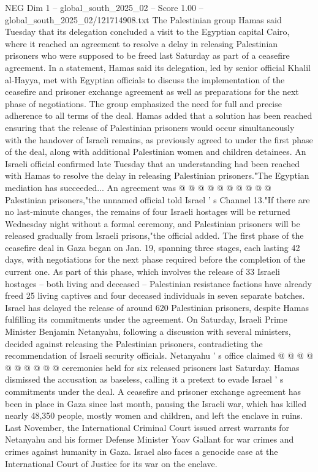 \begin{textsample}{NEG Dim 1 – global\_south\_2025\_02 – Score 1.00 – global\_south\_2025\_02/121714908.txt}  \label{ex:f1_neg_035}
The Palestinian group Hamas said Tuesday that its delegation concluded a visit to the Egyptian capital Cairo, where it reached an agreement to resolve a delay in releasing Palestinian prisoners who were supposed to be freed last Saturday as part of a ceasefire agreement.
In a statement, Hamas said its delegation, led by senior official Khalil al-Hayya, met with Egyptian officials to discuss the implementation of the ceasefire and prisoner exchange agreement as well as preparations for the next phase of negotiations.
The group emphasized the need for full and precise adherence to all terms of the deal.
Hamas added that a solution has been reached ensuring that the release of Palestinian prisoners would occur simultaneously with the handover of Israeli remains, as previously agreed to under the first phase of the deal, along with additional Palestinian women and children detainees.
An Israeli official confirmed late Tuesday that an understanding had been reached with Hamas to resolve the delay in releasing Palestinian prisoners."The Egyptian mediation has succeeded...
An agreement was @ @ @ @ @ @ @ @ @ @ Palestinian prisoners,"the unnamed official told Israel ' s Channel 13."If there are no last-minute changes, the remains of four Israeli hostages will be returned Wednesday night without a formal ceremony, and Palestinian prisoners will be released gradually from Israeli prisons,"the official added.
The first phase of the ceasefire deal in Gaza began on Jan. 19, spanning three stages, each lasting 42 days, with negotiations for the next phase required before the completion of the current one.
As part of this phase, which involves the release of 33 Israeli hostages -- both living and deceased -- Palestinian resistance factions have already freed 25 living captives and four deceased individuals in seven separate batches.
Israel has delayed the release of around 620 Palestinian prisoners, despite Hamas fulfilling its commitments under the agreement.
On Saturday, Israeli Prime Minister Benjamin Netanyahu, following a discussion with several ministers, decided against releasing the Palestinian prisoners, contradicting the recommendation of Israeli security officials.
Netanyahu ' s office claimed @ @ @ @ @ @ @ @ @ @ ceremonies held for six released prisoners last Saturday.
Hamas dismissed the accusation as baseless, calling it a pretext to evade Israel ' s commitments under the deal.
A ceasefire and prisoner exchange agreement has been in place in Gaza since last month, pausing the Israeli war, which has killed nearly 48,350 people, mostly women and children, and left the enclave in ruins.
Last November, the International Criminal Court issued arrest warrants for Netanyahu and his former Defense Minister Yoav Gallant for war crimes and crimes against humanity in Gaza.
Israel also faces a genocide case at the International Court of Justice for its war on the enclave.

\end{textsample}
